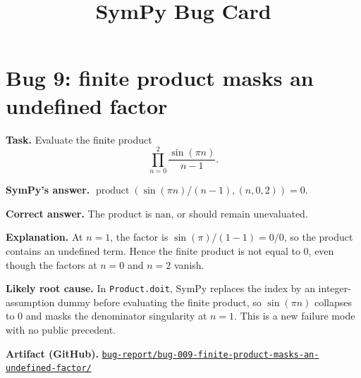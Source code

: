\documentclass[11pt]{article}
\title{SymPy Bug Card}
\author{}
\date{}
\newcommand{\artifactrepo}{https://github.com/TODO-org/TODO-repo}
\newcommand{\bugbundle}[1]{\href{\artifactrepo/tree/main/bug-report/#1}{\nolinkurl{bug-report/#1/}}}
\begin{document}
\maketitle

\section*{Bug 9: finite product masks an undefined factor}

\begin{counterexamplebox}
\textbf{Task.} Evaluate the finite product
\[
\prod_{n=0}^{2}\frac{\sin(\pi n)}{n-1}.
\]

\medskip
\textbf{SymPy's answer.} \(\operatorname{product}(\sin(\pi n)/(n-1),(n,0,2))=0\).

\medskip
\textbf{Correct answer.} The product is \(\mathrm{nan}\), or should remain
unevaluated.

\medskip
\textbf{Explanation.} At \(n=1\), the factor is \(\sin(\pi)/(1-1)=0/0\),
so the product contains an undefined term. Hence the finite product is not
equal to \(0\), even though the factors at \(n=0\) and \(n=2\) vanish.

\medskip
\textbf{Likely root cause.} In \texttt{Product.doit}, SymPy replaces the index
by an integer-assumption dummy before evaluating the finite product, so
\(\sin(\pi n)\) collapses to \(0\) and masks the denominator singularity at
\(n=1\). This is a new failure mode with no public precedent.

\medskip
\textbf{Artifact (GitHub).} \bugbundle{bug-009-finite-product-masks-an-undefined-factor}
\end{counterexamplebox}
\end{document}
